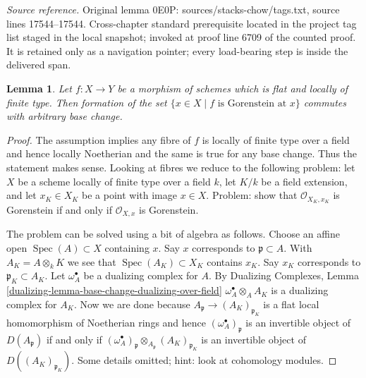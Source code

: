 \documentclass[10pt,a4paper]{amsart}
\theoremstyle{plain}
\newtheorem{lemma}[subsection]{Lemma}
\theoremstyle{definition}
\theoremstyle{remark}
\numberwithin{equation}{subsection}
\def\Spec{\mathop{\mathrm{Spec}}}
\begin{document}
\noindent\textit{Source reference.} Original lemma 0E0P: sources/stacks-chow/tags.txt, source lines 17544--17544. Cross-chapter standard prerequisite located in the project tag list staged in the local snapshot; invoked at proof line 6709 of the counted proof. It is retained only as a navigation pointer; every load-bearing step is inside the delivered span.\par\medskip
\begin{lemma}
\label{lemma-flat-lft-base-change-gorenstein}
Let $f : X \to Y$ be a morphism of schemes which is flat and
locally of finite type. Then formation of the set
$\{x \in X \mid f\text{ is Gorenstein at }x\}$
commutes with arbitrary base change.
\end{lemma}

\begin{proof}
The assumption implies any fibre of $f$ is locally of finite type
over a field and hence locally Noetherian and the same is true for
any base change. Thus the statement makes sense. Looking at
fibres we reduce to the following problem: let $X$ be a scheme
locally of finite type over a field $k$,
let $K/k$ be a field extension, and
let $x_K \in X_K$ be a point with image $x \in X$.
Problem: show that $\mathcal{O}_{X_K, x_K}$ is Gorenstein if and only if
$\mathcal{O}_{X, x}$ is Gorenstein.

\medskip\noindent
The problem can be solved using a bit of algebra as follows.
Choose an affine open $\Spec(A) \subset X$ containing $x$.
Say $x$ corresponds to $\mathfrak p \subset A$.
With $A_K = A \otimes_k K$ we see that $\Spec(A_K) \subset X_K$
contains $x_K$. Say $x_K$ corresponds to $\mathfrak p_K \subset A_K$.
Let $\omega_A^\bullet$ be a dualizing complex for $A$.
By Dualizing Complexes, Lemma
\ref{dualizing-lemma-base-change-dualizing-over-field}
$\omega_A^\bullet \otimes_A A_K$ is a dualizing complex for $A_K$.
Now we are done because
$A_\mathfrak p \to (A_K)_{\mathfrak p_K}$ is a flat local
homomorphism of Noetherian rings and hence
$(\omega_A^\bullet)_\mathfrak p$ is an invertible object
of $D(A_\mathfrak p)$ if and only if
$(\omega_A^\bullet)_\mathfrak p \otimes_{A_\mathfrak p} (A_K)_{\mathfrak p_K}$
is an invertible object of $D((A_K)_{\mathfrak p_K})$.
Some details omitted; hint: look at cohomology modules.
\end{proof}
\end{document}
